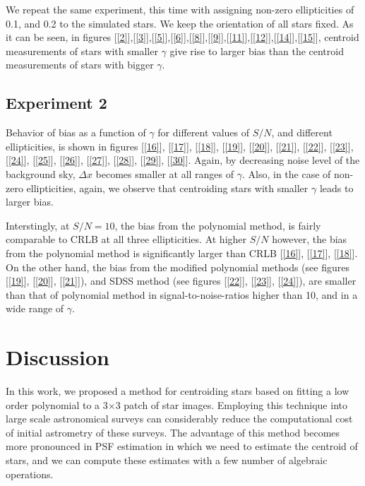 \documentclass[12pt, preprint]{aastex}
\begin{document}
We repeat the same experiment, this time with assigning non-zero ellipticities of 0.1, and 0.2 to the simulated stars. We keep the orientation of all stars fixed. As it can be seen, in figures [\ref{2}],[\ref{3}],[\ref{5}],[\ref{6}],[\ref{8}],[\ref{9}],[\ref{11}],[\ref{12}],[\ref{14}],[\ref{15}], centroid measurements of stars with smaller $\gamma$ give rise to larger bias than the centroid measurements of stars with bigger $\gamma$.


\subsection{Experiment 2}

Behavior of bias as a function of $\gamma$ for different values of $S/N$, and different ellipticities, is shown in figures [\ref{16}], [\ref{17}], [\ref{18}], [\ref{19}], [\ref{20}], [\ref{21}], [\ref{22}], [\ref{23}], [\ref{24}], [\ref{25}], [\ref{26}], [\ref{27}], [\ref{28}], [\ref{29}], [\ref{30}].  Again, by decreasing noise level of the background sky, $\Delta x$ becomes smaller at all ranges of $\gamma$. Also, in the case of non-zero ellipticities, again, we observe that centroiding stars with smaller $\gamma$ leads to larger bias.  

Interstingly, at $S/N=10$, the bias from the polynomial method, is fairly comparable to CRLB at all three ellipticities. At higher $S/N$ however, the bias from the polynomial method is significantly larger than CRLB [\ref{16}], [\ref{17}], [\ref{18}]. On the other hand, the bias from the modified polynomial methods (see figures [\ref{19}], [\ref{20}], [\ref{21}]), and SDSS method (see figures [\ref{22}], [\ref{23}], [\ref{24}]), are smaller than that of polynomial method in signal-to-noise-ratios higher than 10, and in a wide range of $\gamma$.

   

   


\section{Discussion}\label{sec:discussion}

In this work, we proposed a method for centroiding stars based on fitting a low order polynomial to a 3$\times$3 patch of star images. Employing this technique into large scale astronomical surveys can considerably reduce the computational cost of initial astrometry of these surveys. The advantage of this method becomes more pronounced in PSF estimation in which we need to estimate the centroid of stars, and we can compute these estimates with a few number of algebraic operations.
\end{document}
